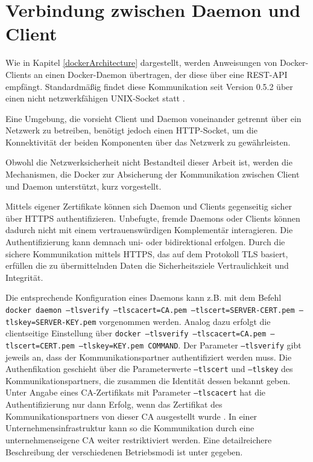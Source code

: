 \documentclass[../main.tex]{subfiles}
\begin{document}


  \section{Verbindung zwischen Daemon und Client}
  \label{conClientServer}
    Wie in Kapitel \ref{dockerArchitecture} dargestellt, werden Anweisungen von Docker-Clients an einen Docker-Daemon übertragen, der diese über eine REST-API empfängt. Standardmäßig findet diese Kommunikation seit Version 0.5.2 über einen nicht netzwerkfähigen UNIX-Socket statt \cite{dockerSecurity}.

    Eine Umgebung, die vorsieht Client und Daemon voneinander getrennt über ein Netzwerk zu betreiben, benötigt jedoch einen HTTP-Socket, um die Konnektivität der beiden Komponenten über das Netzwerk zu gewährleisten.

    Obwohl die Netzwerksicherheit nicht Bestandteil dieser Arbeit ist, werden die Mechanismen, die Docker zur Absicherung der Kommunikation zwischen Client und Daemon unterstützt, kurz vorgestellt.

    Mittels eigener Zertifikate können sich Daemon und Clients gegenseitig sicher über HTTPS authentifizieren. Unbefugte, fremde Daemons oder Clients können dadurch nicht mit einem vertrauenswürdigen Komplementär interagieren. Die Authentifizierung kann demnach uni- oder bidirektional erfolgen. Durch die sichere Kommunikation mittels HTTPS, das auf dem Protokoll TLS basiert, erfüllen die zu übermittelnden Daten die Sicherheitsziele Vertraulichkeit und Integrität.

    Die entsprechende Konfiguration eines Daemons kann z.B. mit dem Befehl \texttt{docker daemon --tlsverify --tlscacert=CA.pem --tlscert=SERVER-CERT.pem --tlskey=SERVER-KEY.pem} vorgenommen werden. Analog dazu erfolgt die clientseitige Einstellung über \texttt{docker --tlsverify --tlscacert=CA.pem --tlscert=CERT.pem --tlskey=KEY.pem COMMAND}. Der Parameter \texttt{--tlsverify} gibt jeweils an, dass der Kommunikationspartner authentifiziert werden muss. Die Authenfikation geschieht über die Parameterwerte \texttt{--tlscert} und \texttt{--tlskey} des Kommunikationspartners, die zusammen die Identität dessen bekannt geben. Unter Angabe eines CA-Zertifikats mit Parameter \texttt{--tlscacert} hat die Authentifizierung nur dann Erfolg, wenn das Zertifikat des Kommunikationspartners von dieser CA ausgestellt wurde \cite{dockerSecurityHTTPS}. In einer Unternehmensinfrastruktur kann so die Kommunikation durch eine unternehmenseigene CA weiter restriktiviert werden. Eine detailreichere Beschreibung der verschiedenen Betriebsmodi ist unter \cite{dockerSecurityHTTPS} gegeben.
\end{document}
